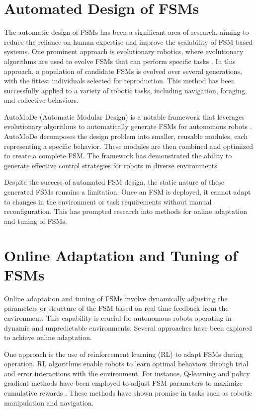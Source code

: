 \documentclass{ULBreport}
\begin{document}
\section{Automated Design of FSMs}
The automatic design of FSMs has been a significant area of research, aiming to reduce the reliance on human expertise and improve the scalability of FSM-based systems. One prominent approach is evolutionary robotics, where evolutionary algorithms are used to evolve FSMs that can perform specific tasks \cite{Nolfi2000}. In this approach, a population of candidate FSMs is evolved over several generations, with the fittest individuals selected for reproduction. This method has been successfully applied to a variety of robotic tasks, including navigation, foraging, and collective behaviors.

AutoMoDe (Automatic Modular Design) is a notable framework that leverages evolutionary algorithms to automatically generate FSMs for autonomous robots \cite{Francesca2014}. AutoMoDe decomposes the design problem into smaller, reusable modules, each representing a specific behavior. These modules are then combined and optimized to create a complete FSM. The framework has demonstrated the ability to generate effective control strategies for robots in diverse environments.

Despite the success of automated FSM design, the static nature of these generated FSMs remains a limitation. Once an FSM is deployed, it cannot adapt to changes in the environment or task requirements without manual reconfiguration. This has prompted research into methods for online adaptation and tuning of FSMs.

\section{Online Adaptation and Tuning of FSMs}
Online adaptation and tuning of FSMs involve dynamically adjusting the parameters or structure of the FSM based on real-time feedback from the environment. This capability is crucial for autonomous robots operating in dynamic and unpredictable environments. Several approaches have been explored to achieve online adaptation.

One approach is the use of reinforcement learning (RL) to adapt FSMs during operation. RL algorithms enable robots to learn optimal behaviors through trial and error interactions with the environment. For instance, Q-learning and policy gradient methods have been employed to adjust FSM parameters to maximize cumulative rewards \cite{Kober2013}. These methods have shown promise in tasks such as robotic manipulation and navigation.
\end{document}
